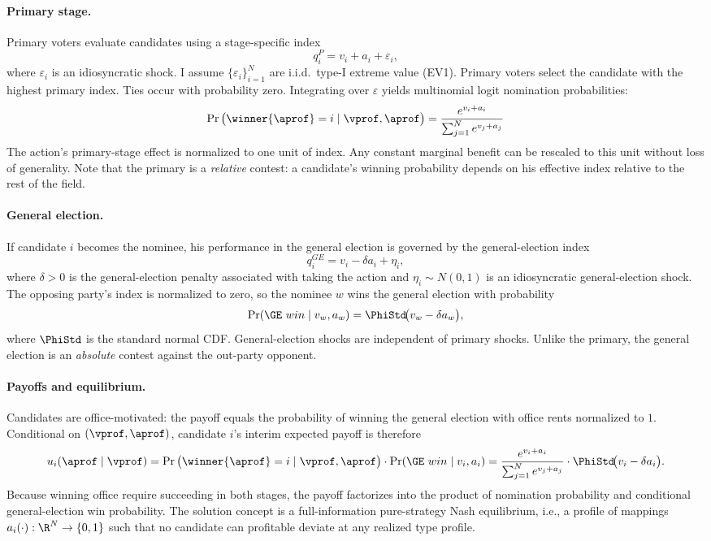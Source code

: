 \paragraph{Primary stage.}
Primary voters evaluate candidates using a stage-specific index
\[
    q_i^{P} = v_i + a_i + \varepsilon_i,
\]
where $\varepsilon_i$ is an idiosyncratic shock. I assume $\{\varepsilon_i\}_{i=1}^N$ are i.i.d.\ type-I extreme value (EV1). Primary voters select the candidate with the highest primary index. Ties occur with probability zero. Integrating over $\varepsilon$ yields multinomial logit nomination probabilities:
\[
    \Pr\big(\winner{\aprof} =i\mid \vprof, \aprof \big) = \frac{e^{v_i + a_i}}{\sum_{j=1}^N e^{v_j+a_j}}
\]
The action's primary-stage effect is normalized to one unit of index. Any constant marginal benefit can be rescaled to this unit without loss of generality. Note that the primary is a \emph{relative} contest: a candidate's winning probability depends on his effective index relative to the rest of the field.

\paragraph*{General election.}
If candidate $i$ becomes the nominee, his performance in the general election is governed by the general-election index
\[
    q_i^{GE} = v_i - \delta a_i + \eta_i,
\]
where $\delta > 0$ is the general-election penalty associated with taking the action and $\eta_i\sim N(0,1)$ is an idiosyncratic general-election shock. The opposing party's index is normalized to zero, so the nominee $w$ wins the general election with probability
\[
    \Pr(\GE\ win \mid v_w, a_w) =\PhiStd\!\big(v_w-\delta a_w\big),
\]
where $\PhiStd$ is the standard normal CDF. General-election shocks are independent of primary shocks. Unlike the primary, the general election is an \emph{absolute} contest against the out-party opponent.

\paragraph{Payoffs and equilibrium.}
Candidates are office-motivated: the payoff equals the probability of winning the general election with office rents normalized to $1$. Conditional on $(\vprof, \aprof)$, candidate $i$'s interim expected payoff is therefore
\[
    u_i(\aprof\mid\vprof) = \Pr\big(\winner{\aprof} =i\mid \vprof, \aprof \big) \cdot \Pr(\GE\ win \mid v_i, a_i) = \frac{e^{v_i + a_i}}{\sum_{j=1}^N e^{v_j+a_j}}\cdot \PhiStd\!\big(v_i-\delta a_i\big).
\]
Because winning office require succeeding in both stages, the payoff factorizes into the product of nomination probability and conditional general-election win probability. The solution concept is a full-information pure-strategy Nash equilibrium, i.e., a profile of mappings $a_i(\cdot): \R^N\to\{0,1\}$ such that no candidate can profitable deviate at any realized type profile.